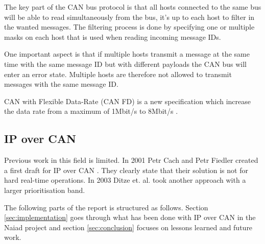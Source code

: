 The key part of the CAN bus protocol is that all hosts connected to the same
bus will be able to read simultaneously from the bus, it's up to each host to
filter in the wanted messages. The filtering process is done by specifying one
or multiple masks on each host that is used when reading incoming message
IDs.

One important aspect is that if multiple hosts transmit a message at the same
time with the same message ID but with different payloads the CAN bus will
enter an error state. Multiple hosts are therefore not allowed to transmit messages with the
same message ID.

CAN with Flexible Data-Rate (CAN FD) is a new specification which increase the
data rate from a maximum of 1Mbit/s to 8Mbit/s \cite{standard:can_bus_fd}.

\subsection{IP over CAN}
Previous work in this field is limited. In 2001 Petr Cach and Petr Fiedler
created a first draft for IP over CAN \cite{web:draft-ip_over_can}. They
clearly state that their solution is not for hard real-time operations. In
2003 Ditze et. al. \cite{web:porting_ip_can} took another approach with a larger prioritisation
band.

The following parts of the report is structured as follows. Section \ref{sec:implementation}
goes through what has been done with IP over CAN in the Naiad project and section
\ref{sec:conclusion} focuses on lessons learned and future work.
